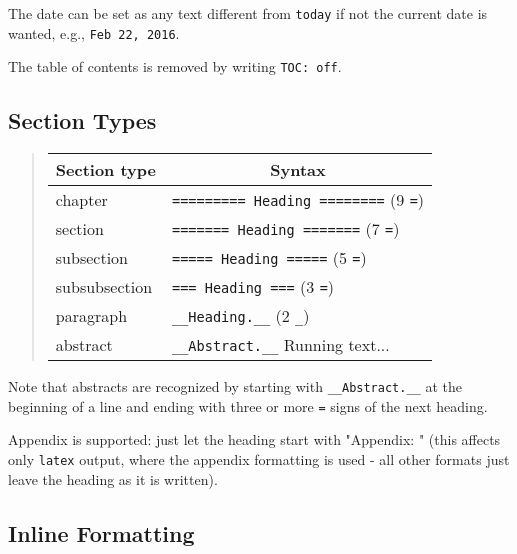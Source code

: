 \documentclass[twoside]{article}
\begin{document}
The date can be set as any text different from {\fontsize{10pt}{10pt}\verb!today!} if not the
current date is wanted, e.g., {\fontsize{10pt}{10pt}\verb!Feb 22, 2016!}.

The table of contents is removed by writing {\fontsize{10pt}{10pt}\verb!TOC: off!}.

\subsection{Section Types}

\label{quick:sections}


\begin{quote}\begin{tabular}{ll}
\hline
\multicolumn{1}{c}{ Section type } & \multicolumn{1}{c}{ Syntax } \\
\hline
chapter                              & {\fontsize{10pt}{10pt}\verb!========= Heading ========!} (9 {\fontsize{10pt}{10pt}\verb!=!}) \\
section                              & {\fontsize{10pt}{10pt}\verb!======= Heading =======!}    (7 {\fontsize{10pt}{10pt}\verb!=!}) \\
subsection                           & {\fontsize{10pt}{10pt}\verb!===== Heading =====!}        (5 {\fontsize{10pt}{10pt}\verb!=!}) \\
subsubsection                        & {\fontsize{10pt}{10pt}\verb!=== Heading ===!}            (3 {\fontsize{10pt}{10pt}\verb!=!}) \\
paragraph                            & {\fontsize{10pt}{10pt}\verb!__Heading.__!}               (2 {\fontsize{10pt}{10pt}\verb!_!}) \\
abstract                             & {\fontsize{10pt}{10pt}\verb!__Abstract.__!} Running text...      \\
\hline
\end{tabular}\end{quote}

\noindent
Note that abstracts are recognized by starting with {\fontsize{10pt}{10pt}\verb!__Abstract.__!} at
the beginning of a line and ending with three or more {\fontsize{10pt}{10pt}\verb!=!} signs of the
next heading.

Appendix is supported: just let the heading start with "Appendix: "
(this affects only {\fontsize{10pt}{10pt}\verb!latex!} output, where the appendix formatting
is used - all other formats just leave the heading as it is written).

\subsection{Inline Formatting}
\end{document}
